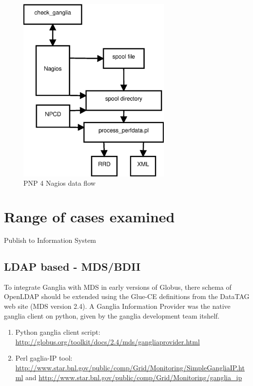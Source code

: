 \begin{figure}[htb]
\centering
 \includegraphics[width=3in]{images/npcd_pnp4nagios.eps}
\caption{PNP 4 Nagios data flow}
\label{figure:pnp4nagios}
\end{figure}

\section{Range of cases examined}

Publish to Information System \cite{goelagent}

\subsection{LDAP based - MDS/BDII}

To integrate Ganglia with MDS in early versions of Globus, there schema of OpenLDAP should be extended using the Glue-CE definitions from the DataTAG web site (MDS version 2.4). A Ganglia Information Provider was the native ganglia client on python, given by the ganglia development team itshelf.

\begin{enumerate}
  \item Python ganglia client script: \url{http://globus.org/toolkit/docs/2.4/mds/gangliaprovider.html}
  \item Perl gaglia-IP tool: \url{http://www.star.bnl.gov/public/comp/Grid/Monitoring/SimpleGangliaIP.html} and \url{http://www.star.bnl.gov/public/comp/Grid/Monitoring/ganglia\_ip}
\end{enumerate}

